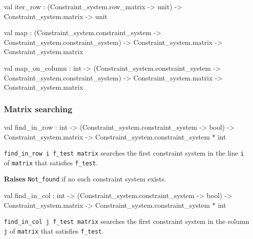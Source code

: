 \begin{ocamldocsigend}
\begin{ocamldocdescription}
\end{ocamldocdescription}


\label{val:Constraint-underscoresystem.Matrix.iter-underscorerow}\begin{ocamldoccode}
val iter_row :
  (Constraint_system.row_matrix -> unit) -> Constraint_system.matrix -> unit
\end{ocamldoccode}


\label{val:Constraint-underscoresystem.Matrix.map}\begin{ocamldoccode}
val map :
  (Constraint_system.constraint_system -> Constraint_system.constraint_system) ->
  Constraint_system.matrix -> Constraint_system.matrix
\end{ocamldoccode}


\label{val:Constraint-underscoresystem.Matrix.map-underscoreon-underscorecolumn}\begin{ocamldoccode}
val map_on_column :
  int ->
  (Constraint_system.constraint_system -> Constraint_system.constraint_system) ->
  Constraint_system.matrix -> Constraint_system.matrix
\end{ocamldoccode}


\subsubsection{Matrix searching}


\label{val:Constraint-underscoresystem.Matrix.find-underscorein-underscorerow}\begin{ocamldoccode}
val find_in_row :
  int ->
  (Constraint_system.constraint_system -> bool) ->
  Constraint_system.matrix -> Constraint_system.constraint_system * int
\end{ocamldoccode}
\begin{ocamldocdescription}
{\tt{find\_in\_row i f\_test matrix}} searches the first constraint system in the line {\tt{i}} of {\tt{matrix}} that satisfies {\tt{f\_test}}.

{\bf Raises} {\tt{Not\_found}} if no such constraint system exists.


\end{ocamldocdescription}


\label{val:Constraint-underscoresystem.Matrix.find-underscorein-underscorecol}\begin{ocamldoccode}
val find_in_col :
  int ->
  (Constraint_system.constraint_system -> bool) ->
  Constraint_system.matrix -> Constraint_system.constraint_system * int
\end{ocamldoccode}
\begin{ocamldocdescription}
{\tt{find\_in\_col j f\_test matrix}} searches the first constraint system in the column {\tt{j}} of {\tt{matrix}} that satisfies {\tt{f\_test}}.


\end{ocamldocdescription}
\end{ocamldocsigend}
